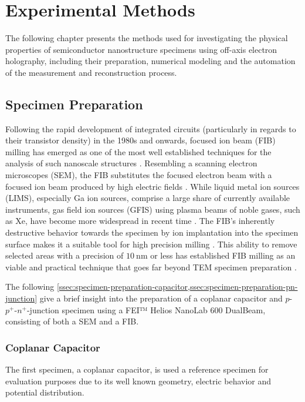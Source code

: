\chapter{Experimental Methods} \label{chap:experimental-methods}
The following chapter presents the methods used for investigating the physical properties of semiconductor nanostructure specimens using off-axis electron holography, including their preparation, numerical modeling and the automation of the measurement and reconstruction process.
\section{Specimen Preparation} \label{sec:specimen-preparation}
Following the rapid development of integrated circuits (particularly in regards to their transistor density) in the 1980s and onwards, focused ion beam (FIB) milling has emerged as one of the most well established techniques for the analysis of such nanoscale structures \cite{Orloff2003,Giannuzzi2005}. Resembling a scanning electron microscopes (SEM), the FIB substitutes the focused electron beam with a focused ion beam produced by high electric fields \cite{Orloff2003,Giannuzzi2005}. While liquid metal ion sources (LIMS), especially Ga ion sources, comprise a large share of currently available instruments, gas field ion sources (GFIS) using plasma beams of noble gases, such as Xe, have become more widespread in recent time \cite{Orloff2003,Giannuzzi2005,Burnett2016}. The FIB's inherently destructive behavior towards the specimen by ion implantation into the specimen surface makes it a suitable tool for high precision milling \cite{Orloff2003,Giannuzzi2005}. This ability to remove selected areas with a precision of $\SI{10}{\nm}$ or less has established FIB milling as an viable and practical technique that goes far beyond TEM specimen preparation \cite{Orloff2003,Giannuzzi2005}.

The following \cref{ssec:specimen-preparation-capacitor,ssec:specimen-preparation-pn-junction} give a brief insight into the preparation of a coplanar capacitor and $p$-$p^+$-$n^+$-junction specimen using a FEI™ Helios NanoLab 600 DualBeam, consisting of both a SEM and a FIB.
\newpage
\subsection{Coplanar Capacitor} \label{ssec:specimen-preparation-capacitor}
The first specimen, a coplanar capacitor, is used a reference specimen for evaluation purposes due to its well known geometry, electric behavior and potential distribution.

